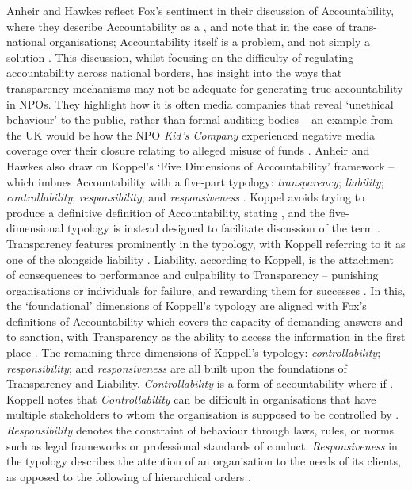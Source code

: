 Anheir and Hawkes reflect Fox's sentiment in their discussion of Accountability, where they describe Accountability as a , and note that in the case of trans-national organisations; Accountability itself is a problem, and not simply a solution \cite{anheier_accountability_2009}. This discussion, whilst focusing on the difficulty of regulating accountability across national borders, has insight into the ways that transparency mechanisms may not be adequate for generating true accountability in NPOs. They highlight how it is often media companies that reveal `unethical behaviour' to the public, rather than formal auditing bodies -- an example from the UK would be how the NPO \textit{Kid's Company} experienced negative media coverage over their closure relating to alleged misuse of funds \cite{elgot_kids_2015, anheier_accountability_2009}. Anheir and Hawkes also draw on Koppel's `Five Dimensions of Accountability' framework -- which imbues Accountability with a five-part typology: \textit{transparency}; \textit{liability}; \textit{controllability}; \textit{responsibility}; and \textit{responsiveness} \cite{anheier_accountability_2009, koppell_pathologies_2005}.
%
Koppel avoids trying to produce a definitive definition of Accountability, stating , and the five-dimensional typology is instead designed to facilitate discussion of the term \cite{koppell_pathologies_2005}. Transparency features prominently in the typology, with Koppell referring to it as one of the  alongside liability \cite{koppell_pathologies_2005}. Liability, according to Koppell, is the attachment of consequences to performance and culpability to Transparency -- punishing organisations or individuals for failure, and rewarding them for successes \cite{koppell_pathologies_2005}. In this, the `foundational' dimensions of Koppell's typology are aligned with Fox's definitions of Accountability which covers the capacity of demanding answers and to sanction, with Transparency as the ability to access the information in the first place \cite{koppell_pathologies_2005, fox_uncertain_2007}.
%
The remaining three dimensions of Koppell's typology: \textit{controllability}; \textit{responsibility}; and \textit{responsiveness} are all built upon the foundations of Transparency and Liability. \textit{Controllability} is a form of accountability where if  \cite{koppell_pathologies_2005}. Koppell notes that \textit{Controllability} can be difficult in organisations that have multiple stakeholders to whom the organisation is supposed to be controlled by \citep{koppell_pathologies_2005}. \textit{Responsibility} denotes the constraint of behaviour through laws, rules, or norms such as legal frameworks or professional standards of conduct. \textit{Responsiveness} in the typology describes the attention of an organisation to the needs of its clients, as opposed to the following of hierarchical orders \cite{koppell_pathologies_2005}.
%

